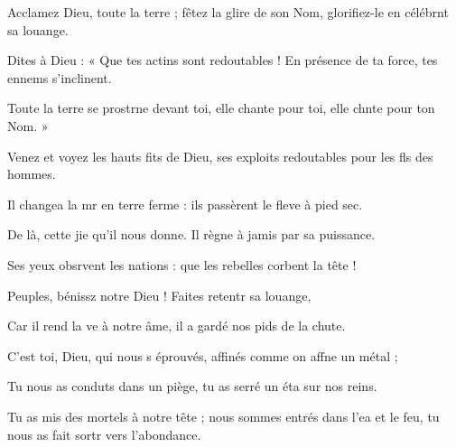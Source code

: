 \item Acclamez Dieu, toute la terre ;\pscross{} fêtez la glire de son Nom,\psstar{} glorifiez-le en célébrnt sa louange.
\item Dites à Dieu : « Que tes actins sont redoutables !\psstar{} En présence de ta force, tes ennems s’inclinent.
\item Toute la terre se prostrne devant toi,\psstar{} elle chante pour toi, elle chnte pour ton Nom. »
\item Venez et voyez les hauts fits de Dieu,\psstar{} ses exploits redoutables pour les fls des hommes.
\item Il changea la mr en terre ferme :\psstar{} ils passèrent le fleve à pied sec. 
\item De là, cette jie qu’il nous donne.\psstar{} Il règne à jamis par sa puissance. 
\item Ses yeux obsrvent les nations :\psstar{} que les rebelles corbent la tête !
\item Peuples, bénissz notre Dieu !\psstar{} Faites retentr sa louange,
\item Car il rend la ve à notre âme,\psstar{} il a gardé nos pids de la chute.
\item C’est toi, Dieu, qui nous s éprouvés,\psstar{} affinés comme on affne un métal ;
\item Tu nous as conduts dans un piège,\psstar{} tu as serré un éta sur nos reins.
\item Tu as mis des mortels à notre tête ;\pscross{} nous sommes entrés dans l’ea et le feu,\psstar{} tu nous as fait sortr vers l’abondance.